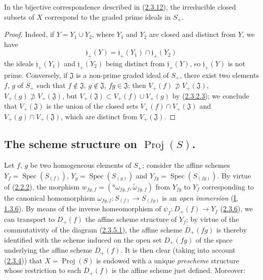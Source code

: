 \begin{corollary}[2.3.17]
\label{II.2.3.17}
In the bijective correspondence described in
(\hyperref[II.2.3.12]{2.3.12}), the irreducible closed subsets of $X$
correspond to the graded prime ideals in $S_+$.
\end{corollary}

\begin{proof}
Indeed, if $Y=Y_1\cup Y_2$, where $Y_1$ and $Y_2$ are closed and distinct
from $Y$, we have
\[
  \mathfrak{j}_+(Y)
  =\mathfrak{j}_+(Y_1)\cap\mathfrak{j}_+(Y_2)
\]
the ideals $\mathfrak{j}_+(Y_1)$ and $\mathfrak{j}_+(Y_2)$ being distinct
from $\mathfrak{j}_+(Y)$, so $\mathfrak{j}_+(Y)$ is not prime.
Conversely, if $\mathfrak{J}$ is a non-prime graded ideal of $S_+$, there
exist two elements $f$, $g$ of $S_+$ such that
$f\notin\mathfrak{J}$, $g\notin\mathfrak{J}$, $fg\in\mathfrak{J}$; then
$V_+(f)\not\supset V_+(\mathfrak{J})$,
$V_+(g)\not\supset V_+(\mathfrak{J})$, but
$V_+(\mathfrak{J})\subset V_+(f)\cup V_+(g)$ by
(\hyperref[II.2.3.2.3]{2.3.2.3}); we conclude that
$V_+(\mathfrak{J})$ is the union of the closed sets
$V_+(f)\cap V_+(\mathfrak{J})$ and $V_+(g)\cap V_+(\mathfrak{J})$, which are
distinct from $V_+(\mathfrak{J})$.
\end{proof}


\subsection{The scheme structure on $\operatorname{Proj}(S)$.}
\label{subsection:II.2.4}

\begin{env}[2.4.1]
\label{II.2.4.1}
Let $f$, $g$ be two homogeneous elements of $S_+$; consider the affine
schemes $Y_f=\operatorname{Spec}(S_{(f)})$,
$Y_g=\operatorname{Spec}(S_{(g)})$ and
$Y_{fg}=\operatorname{Spec}(S_{(fg)})$. By virtue of
(\hyperref[II.2.2.2]{2.2.2}), the morphism
$w_{fg,f}=({}^a\omega_{fg,f},\widetilde{\omega}_{fg,f})$ from $Y_{fg}$ to
$Y_f$ corresponding to the canonical homomorphism
$\omega_{fg,f}:S_{(f)}\to S_{(fg)}$ is an \emph{open immersion}
(\hyperref[I.1.3.6]{I, 1.3.6}). By means of the inverse homeomorphism
of $\psi_f:D_+(f)\to Y_f$ (\hyperref[II.2.3.6]{2.3.6}), we can
transport to $D_+(f)$ the affine scheme structure of $Y_f$; by virtue of
the commutativity of the diagram (\hyperref[II.2.3.5.1]{2.3.5.1}), the
affine scheme $D_+(fg)$ is thereby identified with the scheme induced on the
open set $D_+(fg)$ of the space underlying the affine scheme $D_+(f)$. It is
then clear (taking into account (\hyperref[II.2.3.4]{2.3.4})) that
$X=\operatorname{Proj}(S)$ is endowed with a unique \emph{prescheme}
structure whose restriction to each $D_+(f)$ is the affine scheme just
defined. Moreover:
\end{env}


